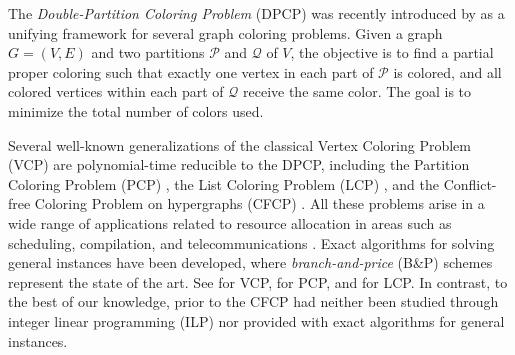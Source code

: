 \documentclass[preprint, 11pt, authoryear]{elsarticle}
\newcommand{\PP}{{\mathcal P}}
\newcommand{\QQ}{{\mathcal Q}}
\newcommand{\quitar}[1]{{\color{red} \sout{#1}}}
\begin{document}
The \emph{Double-Partition Coloring Problem} (DPCP) was recently introduced by \cite{LucciEtAl2025} as a unifying framework for several graph coloring problems.
Given a graph $G=(V,E)$ and two partitions $\PP$ and $\QQ$ of $V$, the objective is to %
find a partial proper coloring such that exactly one vertex in each part of $\PP$ is colored, and all colored vertices within each part of $\QQ$ receive the same color. 
The goal is to minimize the total number of colors used.

Several well-known generalizations of the classical Vertex Coloring Problem (VCP) %
are polynomial-time reducible to the DPCP, including the Partition Coloring Problem (PCP) \citep{li2000partition}, the List Coloring Problem (LCP) \citep{Lucci2024}, and the Conflict-free Coloring Problem on hypergraphs (CFCP) \citep{Even2003}. %
All these problems %
arise in a wide range of applications related to resource allocation in areas such as scheduling, compilation, and telecommunications \citep{JensenToft2011}.
Exact algorithms for solving general instances have been developed, where \emph{branch-and-price} (B\&P) schemes represent the state of the art. See \citet{Trick1996,MalagutiEtAl2011} for VCP,  \citet{Furini2018} for PCP, and \citet{Lucci2024} for LCP.
In contrast, to the best of our knowledge, prior to \citet{LucciEtAl2025} the CFCP had neither been studied through integer linear programming (ILP) nor provided with exact algorithms for general instances.
\end{document}
